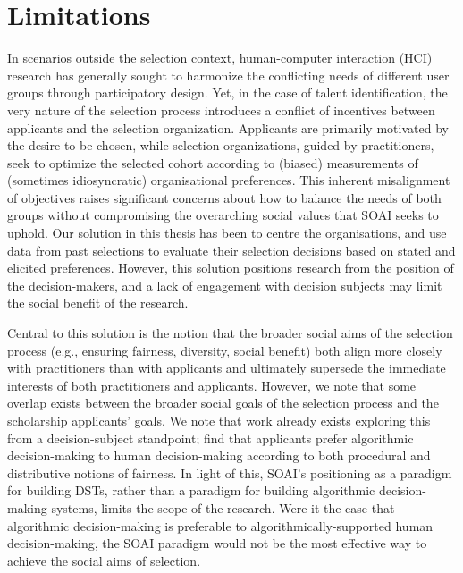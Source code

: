 
\section{Limitations}
In scenarios outside the selection context, human-computer interaction (HCI) research has generally sought to harmonize the conflicting needs of different user groups through participatory design. Yet, in the case of talent identification, the very nature of the selection process introduces a conflict of incentives between applicants and the selection organization. Applicants are primarily motivated by the desire to be chosen, while selection organizations, guided by practitioners, seek to optimize the selected cohort according to (biased) measurements of (sometimes idiosyncratic) organisational preferences. This inherent misalignment of objectives raises significant concerns about how to balance the needs of both groups without compromising the overarching social values that SOAI seeks to uphold. Our solution in this thesis has been to centre the organisations, and use data from past selections to evaluate their selection decisions based on stated and elicited preferences. However, this solution positions research from the position of the decision-makers, and a lack of engagement with decision subjects may limit the social benefit of the research.

Central to this solution is the notion that the broader social aims of the selection process (e.g., ensuring fairness, diversity, social benefit) both align more closely with practitioners than with applicants and ultimately supersede the immediate interests of both practitioners and applicants. However, we note that some overlap exists between the broader social goals of the selection process and the scholarship applicants' goals. We note that work already exists exploring this from a decision-subject standpoint; \textcite{10.1145/3351095.3372867} find that applicants prefer algorithmic decision-making to human decision-making according to both procedural and distributive notions of fairness. In light of this, SOAI's positioning as a paradigm for building DSTs, rather than a paradigm for building algorithmic decision-making systems, limits the scope of the research. Were it the case that algorithmic decision-making is preferable to algorithmically-supported human decision-making, the SOAI paradigm would not be the most effective way to achieve the social aims of selection.

